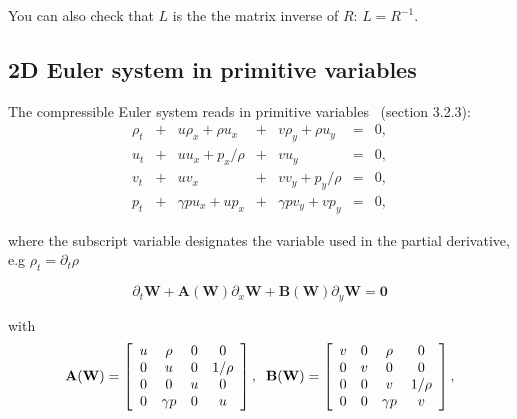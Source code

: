 \documentclass{article}
\begin{document}
You can also check that $L$ is the the matrix inverse of $R$: $L = R^{-1}$.

\subsection*{2D Euler system in primitive variables}
The compressible Euler system reads in primitive variables~\cite{toro} (section 3.2.3):\\

\begin{equation}
  \begin{array}{ccccccc}
    \rho_t & + & u\rho_x+\rho u_x & + & v\rho_y+\rho u_y & = &0,\\
    u_t    & + & u u_x + p_x/\rho & + & v u_y            & = &0,\\
    v_t    & + & u v_x            & + & v v_y + p_y/\rho & = &0,\\
    p_t    & + & \gamma p u_x + u p_x & + & \gamma p v_y + v p_y & = &0,
  \end{array}
\end{equation}

where the subscript variable designates the variable used in the partial derivative, e.g $\rho_t = \partial_t \rho$

\begin{equation}
  \partial_t \mathbf{W} + \mathbf{A(W)} \partial_x \mathbf{W} + \mathbf{B(W)} \partial_y \mathbf{W} = \mathbf{0}
\end{equation}

with
\begin{equation}
  \mathbf{A(W)} = \left[
    \begin{array}{c c c c}
      u & \rho     & 0 & 0 \\
      0 & u        & 0 & 1/\rho\\
      0 & 0        & u & 0 \\
      0 & \gamma p & 0 & u \\
    \end{array}
  \right],
  \;\;
  \mathbf{B(W)} = \left[
    \begin{array}{c c c c}
      v & 0 & \rho     & 0 \\
      0 & v & 0        & 0\\
      0 & 0 & v        & 1/\rho \\
      0 & 0 & \gamma p & v \\
    \end{array}
  \right],
\end{equation}
\end{document}
